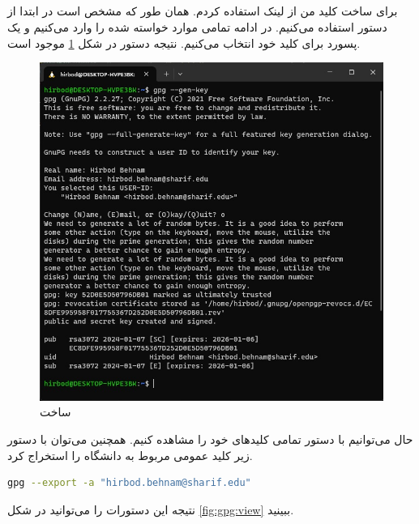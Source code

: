 \documentclass[]{article}
\begin{document}
\subsection{}
برای ساخت کلید من از
لینک استفاده کردم. همان طور که مشخص است در ابتدا از دستور
استفاده می‌کنیم. در ادامه تمامی موارد خواسته شده را وارد می‌کنیم و یک پسورد برای کلید خود انتخاب می‌کنیم.
نتیجه دستور در شکل
\ref{fig:gpg:keygen}
موجود است.
\begin{figure}[H]
    \centering
    \includegraphics[scale=0.5]{pics/gpg-keygen.jpg}
    \caption{ساخت }
    \label{fig:gpg:keygen}
\end{figure}
حال می‌توانیم با دستور
تمامی کلید‌های خود را مشاهده کنیم. همچنین می‌توان با دستور زیر کلید عمومی مربوط به دانشگاه را استخراج کرد.
\begin{latin}
\begin{lstlisting}[language=sh]
gpg --export -a "hirbod.behnam@sharif.edu"
\end{lstlisting}
\end{latin}
نتیجه این دستورات را می‌توانید در شکل
\ref{fig:gpg:view}
ببینید.
\end{document}
